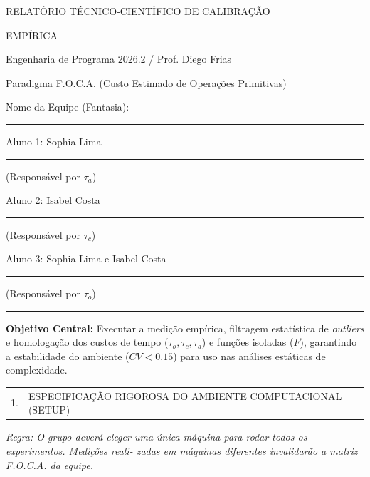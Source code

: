 \documentclass[12pt,a4paper]{article}
\makeatletter
\newcommand{\linha}[1]{\rule{#1}{0.4pt}}
\newcommand{\secaotitulo}[2]{%
  \noindent\begin{tabular}{@{}p{0.7cm}p{15.9cm}@{}}
  #1. & \large\MakeUppercase{#2}
  \end{tabular}\par
}
\makeatother
\begin{document}
\begin{center}
  {\Large RELATÓRIO TÉCNICO-CIENTÍFICO DE CALIBRAÇÃO\par}
  {\Large EMPÍRICA\par}
  \vspace{0.35cm}
  {\large Engenharia de Programa 2026.2 / Prof. Diego Frias\par}
  \vspace{0.15cm}
  {\large Paradigma F.O.C.A. (Custo Estimado de Operações Primitivas)\par}
\end{center}

\vspace{0.85cm}

\noindent Nome da Equipe (Fantasia): \linha{11.3cm}

\vspace{0.28cm}
\noindent Aluno 1: Sophia Lima \linha{11.45cm}\hfill (Responsável por $\tau_a$)

\noindent Aluno 2: Isabel Costa \linha{11.45cm}\hfill (Responsável por $\tau_c$)

\noindent Aluno 3: Sophia Lima e Isabel Costa \linha{11.45cm}\hfill (Responsável por $\tau_o$)

\vspace{0.42cm}
\hrule
\vspace{0.42cm}

\textbf{Objetivo Central:} Executar a medição empírica, filtragem estatística de \textit{outliers} e homologação dos
custos de tempo ($\tau_o,\tau_c,\tau_a$) e funções isoladas ($F$), garantindo a estabilidade do ambiente ($CV<0.15$)
para uso nas análises estáticas de complexidade.

\vspace{0.62cm}
\secaotitulo{1}{Especificação Rigorosa do Ambiente Computacional (Setup)}

\vspace{0.35cm}
\textit{Regra: O grupo deverá eleger uma única máquina para rodar todos os experimentos. Medições reali-
zadas em máquinas diferentes invalidarão a matriz F.O.C.A. da equipe.}
\end{document}
